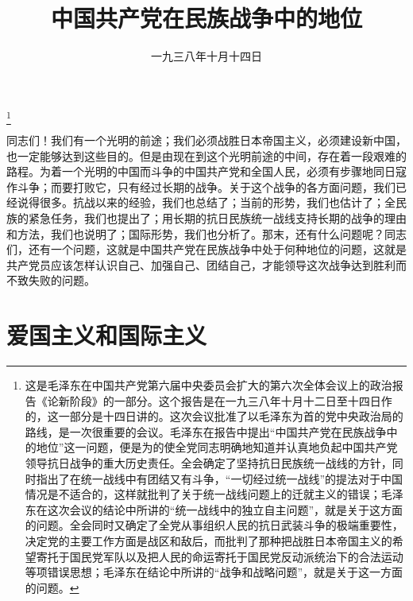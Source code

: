 
\title{中国共产党在民族战争中的地位}
\date{一九三八年十月十四日}
\thanks{这是毛泽东在中国共产党第六届中央委员会扩大的第六次全体会议上的政治报告《论新阶段》的一部分。这个报告是在一九三八年十月十二日至十四日作的，这一部分是十四日讲的。这次会议批准了以毛泽东为首的党中央政治局的路线，是一次很重要的会议。毛泽东在报告中提出“中国共产党在民族战争中的地位”这一问题，便是为的使全党同志明确地知道并认真地负起中国共产党领导抗日战争的重大历史责任。全会确定了坚持抗日民族统一战线的方针，同时指出了在统一战线中有团结又有斗争，“一切经过统一战线”的提法对于中国情况是不适合的，这样就批判了关于统一战线问题上的迁就主义的错误；毛泽东在这次会议的结论中所讲的“统一战线中的独立自主问题”，就是关于这方面的问题。全会同时又确定了全党从事组织人民的抗日武装斗争的极端重要性，决定党的主要工作方面是战区和敌后，而批判了那种把战胜日本帝国主义的希望寄托于国民党军队以及把人民的命运寄托于国民党反动派统治下的合法运动等项错误思想；毛泽东在结论中所讲的“战争和战略问题”，就是关于这一方面的问题。}
\maketitle


同志们！我们有一个光明的前途；我们必须战胜日本帝国主义，必须建设新中国，也一定能够达到这些目的。但是由现在到这个光明前途的中间，存在着一段艰难的路程。为着一个光明的中国而斗争的中国共产党和全国人民，必须有步骤地同日寇作斗争；而要打败它，只有经过长期的战争。关于这个战争的各方面问题，我们已经说得很多。抗战以来的经验，我们也总结了；当前的形势，我们也估计了；全民族的紧急任务，我们也提出了；用长期的抗日民族统一战线支持长期的战争的理由和方法，我们也说明了；国际形势，我们也分析了。那末，还有什么问题呢？同志们，还有一个问题，这就是中国共产党在民族战争中处于何种地位的问题，这就是共产党员应该怎样认识自己、加强自己、团结自己，才能领导这次战争达到胜利而不致失败的问题。

\section{爱国主义和国际主义}

